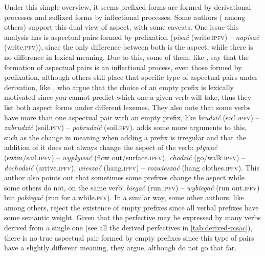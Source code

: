 \documentclass[12pt]{article}
\begin{document}
Under this simple overview, it seems prefixed forms are formed by derivational processes and suffixed forms by inflectional processes. Some authors (\textcite{grzegorczykowa1999Morfologia,wlodarczyk2006SemanticStructuresAspect,nagorko2010PodrecznaGramatykaJezyka,perlin2005IleJestAspektow} among others) support this dual view of aspect, with some caveats. One issue this analysis has is aspectual pairs formed by prefixation (\textit{pisać} (write.\textsc{ipfv}) -- \textit{napisać} (write.\textsc{pfv})), since the only difference between both is the aspect, while there is no difference in lexical meaning. Due to this, some of them, like \textcite{nagorko2010PodrecznaGramatykaJezyka}, say that the formation of aspectual pairs is an inflectional process, even those formed by prefixation, although others still place that specific type of aspectual pairs under derivation, like \textcite{grzegorczykowa1999Morfologia}, who argue that the choice of an empty prefix is lexically motivated since you cannot predict which one a given verb will take, thus they list both aspect forms under different lexemes. They also note that some verbs have more than one aspectual pair with an empty prefix, like \textit{brudzić} (soil.\textsc{ipfv}) -- \textit{zabrudzić} (soil.\textsc{pfv}) -- \textit{pobrudzić} (soil.\textsc{pfv}). \textcite{perlin2005IleJestAspektow} adds some more arguments to this, such as the change in meaning when adding a prefix is irregular and that the addition of it does not always change the aspect of the verb: \textit{pływać} (swim/sail.\textsc{ipfv}) -- \textit{wypływać} (flow out/surface.\textsc{ipfv}), \textit{chodzić} (go/walk.\textsc{ipfv}) -- \textit{dochodzić} (arrive.\textsc{ipfv}), \textit{wieszać} (hang.\textsc{ipfv}) -- \textit{rozwieszać} (hang clothes.\textsc{ipfv}). This author also points out that sometimes some prefixes change the aspect while some others do not, on the same verb: \textit{biegać} (run.\textsc{ipfv}) -- \textit{wybiegać} (run out.\textsc{ipfv}) but \textit{pobiegać} (run for a while.\textsc{pfv}). In a similar way, some other authors, like \textcite{wlodarczyk2006SemanticStructuresAspect} among others, reject the existence of empty prefixes since all verbal prefixes have some semantic weight. Given that the perfective may be expressed by many verbs derived from a single one (see all the derived perfectives in \autoref{tab:derived-pisac}), there is no true aspectual pair formed by empty prefixes since this type of pairs have a slightly different meaning, they argue, although \textcite{grzegorczykowa1999Morfologia}  do not go that far.
\end{document}
